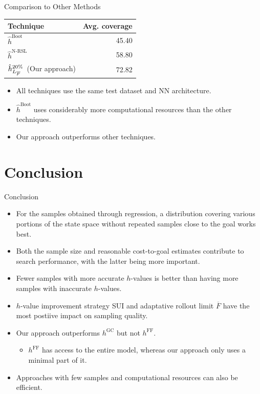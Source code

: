 \documentclass{gkibeamer}
\providecommand{\hvalue}[1]{\ensuremath{h^{#1}}\xspace}
\providecommand{\hff}{\hvalue{\text{FF}}}
\providecommand{\hgc}{\hvalue{\text{GC}}}
\providecommand{\hnrsl}{$\hat h^{\text{N-RSL}}$\xspace}
\providecommand{\hboot}{$\hat h^{\text{Boot}}$\xspace}
\providecommand{\meanfx}{\ensuremath{\overline{F}}\xspace}
\providecommand{\lmeanfx}{\ensuremath{L_{\meanfx}\xspace}}
\providecommand{\hnnrsp}[1]{\ensuremath{\hat h{^{#1\%}_\text{\lmeanfx}}}\xspace}
\providecommand{\hnnrs}{\hnnrsp{20}}
\begin{document}
\begin{frame}{Comparison to Other Methods} %
\begin{table}[]
\begin{tabular}{l|r}
    Technique & Avg. coverage \\
    \hline
    \hboot~\parencite{Ferber.etal/2022} & 45.40 \\
    \hnrsl~\parencite{OToole/2022} & 58.80 \\
    \hnnrs~(Our approach) & 72.82 \\
\end{tabular}
\end{table}
\bigskip
\begin{itemize}
    \pause
    \item All techniques use the same test dataset and NN architecture.
    \pause
    \item \hboot uses considerably more computational resources than the other techniques.
    \pause
    \item Our approach outperforms other techniques.
\end{itemize}
\end{frame}

\section{Conclusion}

\begin{frame}{Conclusion}
\begin{itemize}
    \pause
    \item For the samples obtained through regression, a distribution covering various portions of the state space without repeated samples close to the goal works best.
    \pause
    \item Both the sample size and reasonable cost-to-goal estimates contribute to search performance, with the latter being more important.
    \pause
    \item Fewer samples with more accurate $h$-values is better than having more samples with inaccurate $h$-values.
    \pause
    \item $h$-value improvement strategy SUI and adaptative rollout limit \meanfx have the most postiive impact on sampling quality.
    \pause
    \item Our approach outperforms \hgc but not \hff.
    \pause
    \begin{itemize}
        \item \hff has access to the entire model, whereas our approach only uses a minimal part of it.
    \end{itemize}
    \pause
    \item Approaches with few samples and computational resources can also be efficient.
\end{itemize}
\end{frame}

\printbibliography
\end{document}
